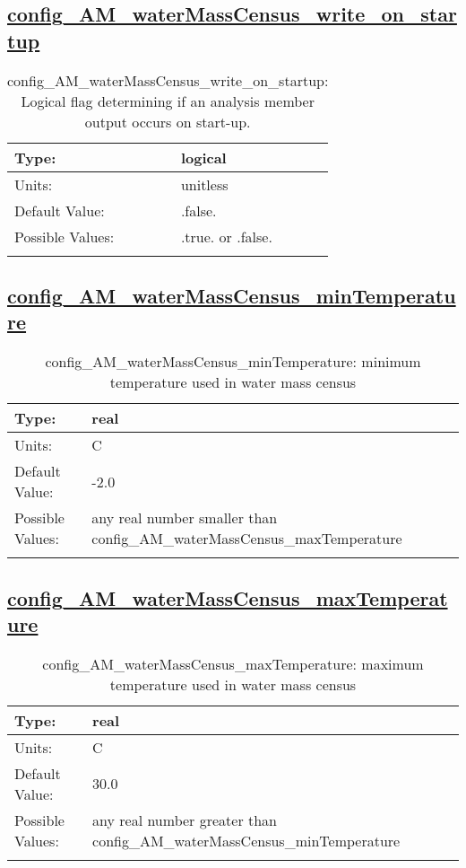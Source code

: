 \subsection[config\_AM\_waterMassCensus\_write\_on\_startup]{\hyperref[sec:nm_tab_AM_waterMassCensus]{config\_AM\_waterMassCensus\_write\_on\_startup}}
\label{subsec:nm_sec_config_AM_waterMassCensus_write_on_startup}
\begin{center}
\begin{longtable}{| p{2.0in} || p{4.0in} |}
    \hline
    Type: & logical \\
    \hline
    Units: & \si{unitless} \\
    \hline
    Default Value: & .false. \\
    \hline
    Possible Values: & .true. or .false. \\
    \hline
    \caption{config\_AM\_waterMassCensus\_write\_on\_startup: Logical flag determining if an analysis member output occurs on start-up.}
\end{longtable}
\end{center}
\subsection[config\_AM\_waterMassCensus\_minTemperature]{\hyperref[sec:nm_tab_AM_waterMassCensus]{config\_AM\_waterMassCensus\_minTemperature}}
\label{subsec:nm_sec_config_AM_waterMassCensus_minTemperature}
\begin{center}
\begin{longtable}{| p{2.0in} || p{4.0in} |}
    \hline
    Type: & real \\
    \hline
    Units: & \si{C} \\
    \hline
    Default Value: & -2.0 \\
    \hline
    Possible Values: & any real number smaller than config\_AM\_waterMassCensus\_maxTemperature \\
    \hline
    \caption{config\_AM\_waterMassCensus\_minTemperature: minimum temperature used in water mass census}
\end{longtable}
\end{center}
\subsection[config\_AM\_waterMassCensus\_maxTemperature]{\hyperref[sec:nm_tab_AM_waterMassCensus]{config\_AM\_waterMassCensus\_maxTemperature}}
\label{subsec:nm_sec_config_AM_waterMassCensus_maxTemperature}
\begin{center}
\begin{longtable}{| p{2.0in} || p{4.0in} |}
    \hline
    Type: & real \\
    \hline
    Units: & \si{C} \\
    \hline
    Default Value: & 30.0 \\
    \hline
    Possible Values: & any real number greater than config\_AM\_waterMassCensus\_minTemperature \\
    \hline
    \caption{config\_AM\_waterMassCensus\_maxTemperature: maximum temperature used in water mass census}
\end{longtable}
\end{center}
